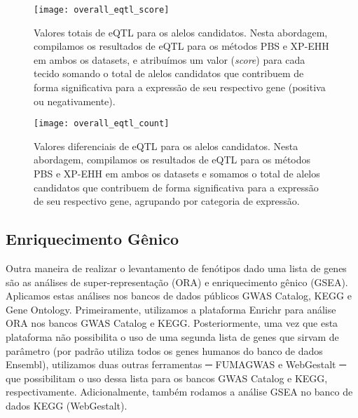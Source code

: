 \begin{figure}[!hp] %
    \centering
    \texttt{[image: overall\_eqtl\_score]}
    \caption[Valores totais de eQTL para os alelos candidatos.]{Valores totais de eQTL para os alelos candidatos. Nesta abordagem, compilamos os resultados de eQTL para os métodos PBS e XP-EHH em ambos os datasets, e atribuímos um valor (\textsl{score}) para cada tecido somando o total de alelos candidatos que contribuem de forma significativa para a expressão de seu respectivo gene (positiva ou negativamente).}
    \label{fig:overall_eqtl_score}
\end{figure}

\begin{figure}[!htbp] %
    \centering
    \texttt{[image: overall\_eqtl\_count]}
    \caption[Valores diferenciais de eQTL para os alelos candidatos.]{Valores diferenciais de eQTL para os alelos candidatos. Nesta abordagem, compilamos os resultados de eQTL para os métodos PBS e XP-EHH em ambos os datasets e somamos o total de alelos candidatos que contribuem de forma significativa para a expressão de seu respectivo gene, agrupando por categoria de expressão.}
    \label{fig:overall_eqtl_count}
\end{figure}

\FloatBarrier

\subsection{Enriquecimento Gênico}

Outra maneira de realizar o levantamento de fenótipos dado uma lista de genes são as análises de super-representação (ORA) e enriquecimento gênico (GSEA). Aplicamos estas análises nos bancos de dados públicos GWAS Catalog, KEGG e Gene Ontology. Primeiramente, utilizamos a plataforma Enrichr para análise ORA nos bancos GWAS Catalog e KEGG. Posteriormente, uma vez que esta plataforma não possibilita o uso de uma segunda lista de genes que sirvam de parâmetro (por padrão utiliza todos os genes humanos do banco de dados Ensembl), utilizamos duas outras ferramentas ─ FUMAGWAS e WebGestalt ─ que possibilitam o uso dessa lista para os bancos GWAS Catalog e KEGG, respectivamente. Adicionalmente, também rodamos a análise GSEA no banco de dados KEGG (WebGestalt).

